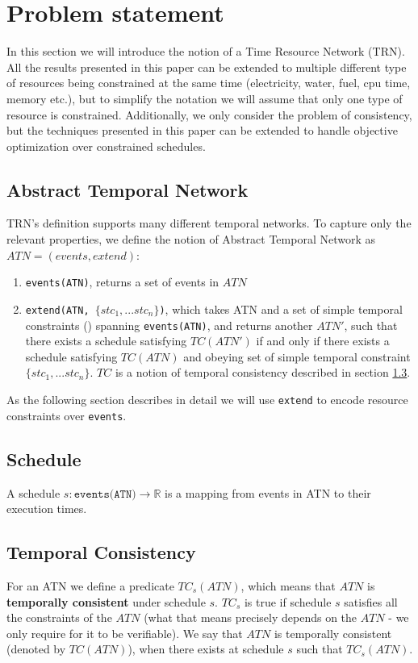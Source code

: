 \section{Problem statement}
In this section we will introduce the notion of a Time Resource Network (TRN). All the results presented in this paper can be extended to multiple different type of resources being constrained at the same time (electricity, water, fuel, cpu time, memory etc.), but to simplify the notation we will assume that only one type of resource is constrained. Additionally, we only consider the problem of consistency, but the techniques presented in this paper can be extended to handle objective optimization over constrained schedules.

\subsection{Abstract Temporal Network}
TRN's definition supports many different temporal networks. To capture only the relevant properties, we define the notion of Abstract Temporal Network as $ATN=(events,extend)$:
\begin{enumerate}
\item \texttt{events(ATN)}, returns a set of events in $ATN$
\item \texttt{extend(ATN, $\{ stc_1, ... stc_n \} $)}, which takes ATN and a set of simple temporal constraints (\cite{dechter1991temporal}) spanning \texttt{events(ATN)}, and returns another $ATN'$, such that there exists a schedule satisfying $TC(ATN')$ if and only if there exists a schedule satisfying $TC(ATN)$ and obeying set of simple temporal constraint $\{ stc_1, ... stc_n \} $. $TC$ is a notion of temporal consistency described in section \ref{temporal_consistency}.
\end{enumerate}
As the following section describes in detail we will use \texttt{extend} to encode resource constraints over \texttt{events}.
\subsection{Schedule}
A schedule $s: \texttt{events(ATN)} \rightarrow \mathbb{R}$ is a mapping from events in ATN to their execution times.
\subsection{Temporal Consistency}
\label{temporal_consistency}
For an ATN we define a predicate $TC_s(ATN)$, which means that $ATN$ is \textbf{temporally consistent} under schedule $s$. $TC_s$ is true if schedule $s$ satisfies all the constraints of the $ATN$ (what that means precisely depends on the $ATN$ - we only require for it to be verifiable). We say that $ATN$ is temporally consistent (denoted by $TC(ATN)$), when there exists at schedule $s$ such that $TC_s(ATN)$.


